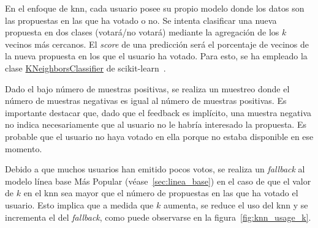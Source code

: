 
En el enfoque de \acrfull{knn}, cada usuario posee su propio modelo donde los datos son las propuestas en las que ha votado o no. Se intenta clasificar una nueva propuesta en dos clases (votará/no votará) mediante la agregación de los $k$ vecinos más cercanos. El \textit{score} de una predicción será el porcentaje de vecinos de la nueva propuesta en los que el usuario ha votado. Para esto, se ha empleado la clase \url{KNeighborsClassifier} de scikit-learn~\cite{pedregosa_scikit-learn_2011}.

Dado el bajo número de muestras positivas, se realiza un muestreo donde el número de muestras negativas es igual al número de muestras positivas. Es importante destacar que, dado que el feedback es implícito, una muestra negativa no indica necesariamente que al usuario no le habría interesado la propuesta. Es probable que el usuario no haya votado en ella porque no estaba disponible en ese momento.

Debido a que muchos usuarios han emitido pocos votos, se realiza un \textit{fallback} al modelo línea base Más Popular (véase~\ref{sec:linea_base}) en el caso de que el valor de $k$ en el \gls{knn} sea mayor que el número de propuestas en las que ha votado el usuario. Esto implica que a medida que $k$ aumenta, se reduce el uso del \gls{knn} y se incrementa el del \textit{fallback}, como puede observarse en la figura~\ref{fig:knn_usage_k}.

